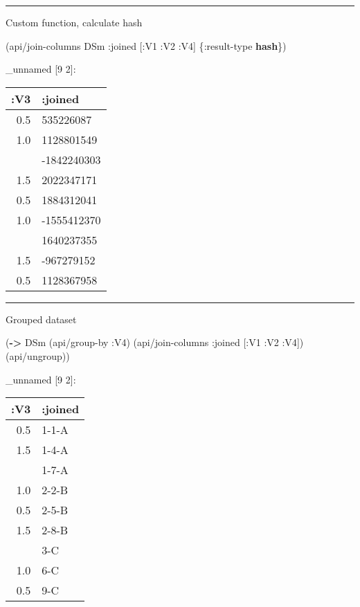 \documentclass[]{article}
\newenvironment{Shaded}{\begin{snugshade}}{\end{snugshade}}
\newcommand{\KeywordTok}[1]{\textcolor[rgb]{0.13,0.29,0.53}{\textbf{#1}}}
\newcommand{\AttributeTok}[1]{\textcolor[rgb]{0.77,0.63,0.00}{#1}}
\newcommand{\NormalTok}[1]{#1}
\begin{document}
\begin{center}\rule{0.5\linewidth}{0.5pt}\end{center}

Custom function, calculate hash

\begin{Shaded}
\begin{Highlighting}[]
\NormalTok{(api/join-columns DSm }\AttributeTok{:joined}\NormalTok{ [}\AttributeTok{:V1} \AttributeTok{:V2} \AttributeTok{:V4}\NormalTok{] \{}\AttributeTok{:result-type} \KeywordTok{hash}\NormalTok{\})}
\end{Highlighting}
\end{Shaded}

\_unnamed {[}9 2{]}:

\begin{longtable}[]{@{}rl@{}}
\toprule
:V3 & :joined\tabularnewline
\midrule
\endhead
0.5 & 535226087\tabularnewline
1.0 & 1128801549\tabularnewline
& -1842240303\tabularnewline
1.5 & 2022347171\tabularnewline
0.5 & 1884312041\tabularnewline
1.0 & -1555412370\tabularnewline
& 1640237355\tabularnewline
1.5 & -967279152\tabularnewline
0.5 & 1128367958\tabularnewline
\bottomrule
\end{longtable}

\begin{center}\rule{0.5\linewidth}{0.5pt}\end{center}

Grouped dataset

\begin{Shaded}
\begin{Highlighting}[]
\NormalTok{(}\KeywordTok{->}\NormalTok{ DSm}
\NormalTok{    (api/group-by }\AttributeTok{:V4}\NormalTok{)}
\NormalTok{    (api/join-columns }\AttributeTok{:joined}\NormalTok{ [}\AttributeTok{:V1} \AttributeTok{:V2} \AttributeTok{:V4}\NormalTok{])}
\NormalTok{    (api/ungroup))}
\end{Highlighting}
\end{Shaded}

\_unnamed {[}9 2{]}:

\begin{longtable}[]{@{}rl@{}}
\toprule
:V3 & :joined\tabularnewline
\midrule
\endhead
0.5 & 1-1-A\tabularnewline
1.5 & 1-4-A\tabularnewline
& 1-7-A\tabularnewline
1.0 & 2-2-B\tabularnewline
0.5 & 2-5-B\tabularnewline
1.5 & 2-8-B\tabularnewline
& 3-C\tabularnewline
1.0 & 6-C\tabularnewline
0.5 & 9-C\tabularnewline
\bottomrule
\end{longtable}
\end{document}
